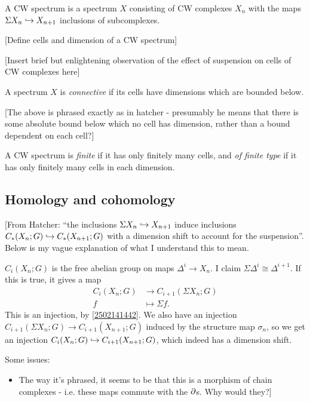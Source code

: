 \documentclass{MetricNotes2023}
\def\inj{\ensuremath\hookrightarrow}
\def\del{\ensuremath\partial}
\begin{document}
\begin{definition}
A CW spectrum is a spectrum \(X\) consisting of CW complexes \(X_n\) with the maps \(\Sigma X_n \inj X_{n+1}\) inclusions of subcomplexes. 
\end{definition}

[Define cells and dimension of a CW spectrum]

[Insert brief but enlightening observation of the effect of suspension on cells of CW complexes here]

\begin{definition}
A spectrum \(X\) is \textit{connective} if its cells have dimensions which are bounded below.
\end{definition}

[The above is phrased exactly as in hatcher - presumably he means that there is some absolute bound below which no cell has dimension, rather than a bound dependent on each cell?]

\begin{definition}
A CW spectrum is \textit{finite} if it has only finitely many cells, and \textit{of finite type} if it has only finitely many cells in each dimension.
\end{definition}

\subsection{Homology and cohomology}

[From Hatcher: ``the inclusions \(\Sigma X_n \inj X_{n+1}\) induce inclusions \(C_*(X_n; G)\inj C_*(X_{n+1}; G)\) with a dimension shift to account for the suspension''. Below is my vague explanation of what I understand this to mean.

\(C_i(X_n; G)\) is the free abelian group on maps \(\Delta^i \to X_n\). I claim \(\Sigma\Delta^i\cong \Delta^{i+1}\). If this is true, it gives a map
\begin{align*}
C_i(X_n;G) &\to C_{i+1}(\Sigma X_n; G)\\
f &\mapsto \Sigma f.
\end{align*}
This is an injection, by \ref{2502141442}. We also have an injection \(C_{i+1}(\Sigma X_n; G)\to C_{i+1}(X_{n+1}; G)\) induced by the structure map \(\sigma_n\), so we get an injection \(C_i(X_n;G)\inj C_{i+1}(X_{n+1};G)\), which indeed has a dimension shift.

Some issues:
\begin{itemize}
\item The way it's phrased, it seems to be that this is a morphism of chain complexes - i.e. these maps commute with the \(\del\)s. Why would they?]
\end{itemize}
\end{document}

